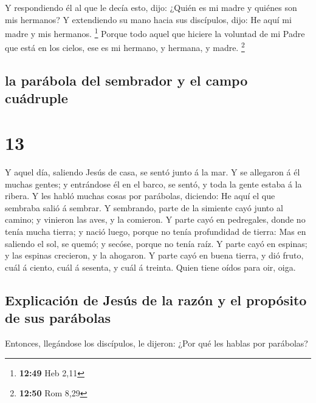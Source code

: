  Y respondiendo él al que le decía esto, dijo: ¿Quién es mi
madre y quiénes son mis hermanos?  Y extendiendo su mano
hacia sus discípulos, dijo: He aquí mi madre y mis hermanos. \footnote{\textbf{12:49}
  Heb 2,11}  Porque todo aquel que hiciere la voluntad de
mi Padre que está en los cielos, ese es mi hermano, y hermana, y madre.
\footnote{\textbf{12:50} Rom 8,29}

\hypertarget{la-paruxe1bola-del-sembrador-y-el-campo-cuuxe1druple}{%
\subsection{la parábola del sembrador y el campo
cuádruple}\label{la-paruxe1bola-del-sembrador-y-el-campo-cuuxe1druple}}

\hypertarget{section-12}{%
\section{13}\label{section-12}}

 Y aquel día, saliendo Jesús de casa, se sentó junto á la
mar.  Y se allegaron á él muchas gentes; y entrándose él en
el barco, se sentó, y toda la gente estaba á la ribera.  Y
les habló muchas cosas por parábolas, diciendo: He aquí el que sembraba
salió á sembrar.  Y sembrando, parte de la simiente cayó
junto al camino; y vinieron las aves, y la comieron.  Y
parte cayó en pedregales, donde no tenía mucha tierra; y nació luego,
porque no tenía profundidad de tierra:  Mas en saliendo el
sol, se quemó; y secóse, porque no tenía raíz.  Y parte cayó
en espinas; y las espinas crecieron, y la ahogaron.  Y parte
cayó en buena tierra, y dió fruto, cuál á ciento, cuál á sesenta, y cuál
á treinta.  Quien tiene oídos para oir, oiga.

\hypertarget{explicaciuxf3n-de-jesuxfas-de-la-razuxf3n-y-el-propuxf3sito-de-sus-paruxe1bolas}{%
\subsection{Explicación de Jesús de la razón y el propósito de sus
parábolas}\label{explicaciuxf3n-de-jesuxfas-de-la-razuxf3n-y-el-propuxf3sito-de-sus-paruxe1bolas}}

 Entonces, llegándose los discípulos, le dijeron: ¿Por qué
les hablas por parábolas?

